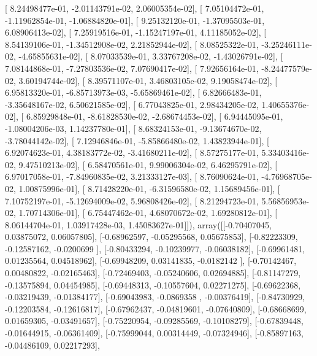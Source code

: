 \documentclass{article}
\begin{document}
       [  8.24498477e-01,  -2.01143791e-02,   2.06005354e-02],
       [  7.05104472e-01,  -1.11962854e-01,  -1.06884820e-01],
       [  9.25132120e-01,  -1.37095503e-01,   6.08906413e-02],
       [  7.25919516e-01,  -1.15247197e-01,   4.11185052e-02],
       [  8.54139106e-01,  -1.34512908e-02,   2.21852944e-02],
       [  8.08525322e-01,  -3.25246111e-02,  -4.65855631e-02],
       [  8.07033539e-01,   3.33767208e-02,  -1.43026791e-02],
       [  7.08144868e-01,  -7.27803536e-02,   7.07690417e-02],
       [  7.92656164e-01,  -8.24477579e-02,   3.60194744e-02],
       [  8.39571107e-01,   3.46803105e-02,   9.19058474e-02],
       [  6.95813320e-01,  -6.85713973e-03,  -5.65869461e-02],
       [  6.82666483e-01,  -3.35648167e-02,   6.50621585e-02],
       [  6.77043825e-01,   2.98434205e-02,   1.40655376e-02],
       [  6.85929848e-01,  -8.61828530e-02,  -2.68674453e-02],
       [  6.94445095e-01,  -1.08004206e-03,   1.14237780e-01],
       [  8.68324153e-01,  -9.13674670e-02,  -3.78044142e-02],
       [  7.12946846e-01,  -5.85866480e-02,   1.43823944e-01],
       [  6.92074623e-01,   4.38183772e-02,  -3.41680211e-02],
       [  8.57275177e-01,   5.33403416e-02,   9.47510213e-02],
       [  6.58470561e-01,   9.99006304e-02,   6.46295791e-02],
       [  6.97017058e-01,  -7.84960835e-02,   3.21333127e-03],
       [  8.76090624e-01,  -4.76968705e-02,   1.00875996e-01],
       [  8.71428220e-01,  -6.31596580e-02,   1.15689456e-01],
       [  7.10752197e-01,  -5.12694009e-02,   5.96808426e-02],
       [  8.21294723e-01,   5.56856953e-02,   1.70714306e-01],
       [  6.75447462e-01,   4.68070672e-02,   1.69280812e-01],
       [  8.06144704e-01,   1.03917428e-03,   1.45083627e-01]]), array([[-0.70407045,  0.03875072,  0.06057805],
       [-0.68962597, -0.05295568,  0.05675853],
       [-0.82223309, -0.12587162, -0.0200699 ],
       [-0.80433294, -0.10239977, -0.06038182],
       [-0.69961481,  0.01235564,  0.04518962],
       [-0.69948209,  0.03141835, -0.0182142 ],
       [-0.70142467,  0.00480822, -0.02165463],
       [-0.72469403, -0.05240606,  0.02694885],
       [-0.81147279, -0.13575894,  0.04454985],
       [-0.69448313, -0.10557604,  0.02271275],
       [-0.69622368, -0.03219439, -0.01384177],
       [-0.69043983, -0.0869358 , -0.00376419],
       [-0.84730929, -0.12203584, -0.12616817],
       [-0.67962437, -0.04819601, -0.07640809],
       [-0.68668699,  0.01659305, -0.03491657],
       [-0.75220954, -0.09285569, -0.10108279],
       [-0.67839448, -0.01644915, -0.06361409],
       [-0.75999044,  0.00314449, -0.07324946],
       [-0.85897163, -0.04486109,  0.02217293],
\end{document}
